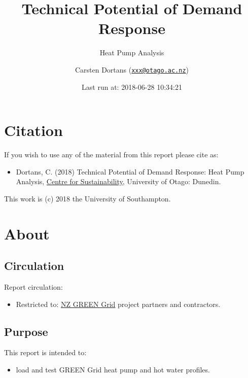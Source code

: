 \documentclass[]{article}
\title{Technical Potential of Demand Response}
\subtitle{Heat Pump Analysis}
\author{Carsten Dortans
(\href{mailto:xxx@otago.ac.nz}{\nolinkurl{xxx@otago.ac.nz}})}
\date{Last run at: 2018-06-28 10:34:21}
\providecommand{\tightlist}{%
  \setlength{\itemsep}{0pt}\setlength{\parskip}{0pt}}
\begin{document}
\maketitle

{
\setcounter{tocdepth}{2}
\tableofcontents
}
\newpage

\section{Citation}\label{citation}

If you wish to use any of the material from this report please cite as:

\begin{itemize}
\tightlist
\item
  Dortans, C. (2018) Technical Potential of Demand Response: Heat Pump
  Analysis, \href{http://www.otago.ac.nz/centre-sustainability/}{Centre
  for Sustainability}, University of Otago: Dunedin.
\end{itemize}

This work is (c) 2018 the University of Southampton.

\newpage

\section{About}\label{about}

\subsection{Circulation}\label{circulation}

Report circulation:

\begin{itemize}
\tightlist
\item
  Restricted to:
  \href{https://www.otago.ac.nz/centre-sustainability/research/energy/otago050285.html}{NZ
  GREEN Grid} project partners and contractors.
\end{itemize}

\subsection{Purpose}\label{purpose}

This report is intended to:

\begin{itemize}
\tightlist
\item
  load and test GREEN Grid heat pump and hot water profiles.
\end{itemize}
\end{document}

